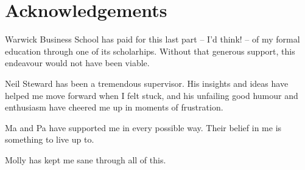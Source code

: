 
\chapter*{Acknowledgements}%
\label{cha:acknowledgements}


Warwick Business School has paid for this last part -- I'd think! --
of my formal education through one of its scholarhips. Without that generous
support, this endeavour would not have been viable.

Neil Steward has been a tremendous supervisor. His insights and ideas have
helped me move forward when I felt stuck, and his unfailing good humour and
enthusiasm have cheered me up in moments of frustration.

Ma and Pa have supported me in every possible way. Their belief in me is
something to live up to.

Molly has kept me sane through all of this.

